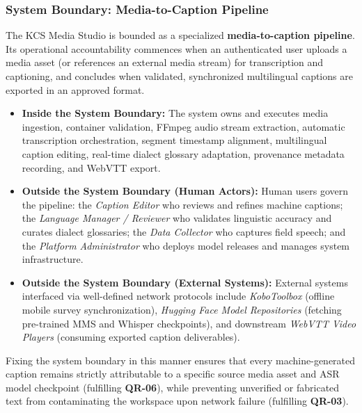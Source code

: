 \documentclass[conference]{IEEEtran}
\begin{document}
\subsubsection{System Boundary: Media-to-Caption Pipeline}
\label{sec:design:arch:boundary}
The KCS Media Studio is bounded as a specialized \textbf{media-to-caption pipeline}. Its operational accountability commences when an authenticated user uploads a media asset (or references an external media stream) for transcription and captioning, and concludes when validated, synchronized multilingual captions are exported in an approved format. 
\begin{itemize}
    \item \textbf{Inside the System Boundary:} The system owns and executes media ingestion, container validation, FFmpeg audio stream extraction, automatic transcription orchestration, segment timestamp alignment, multilingual caption editing, real-time dialect glossary adaptation, provenance metadata recording, and WebVTT export.
    \item \textbf{Outside the System Boundary (Human Actors):} Human users govern the pipeline: the \textit{Caption Editor} who reviews and refines machine captions; the \textit{Language Manager / Reviewer} who validates linguistic accuracy and curates dialect glossaries; the \textit{Data Collector} who captures field speech; and the \textit{Platform Administrator} who deploys model releases and manages system infrastructure.
    \item \textbf{Outside the System Boundary (External Systems):} External systems interfaced via well-defined network protocols include \textit{KoboToolbox} (offline mobile survey synchronization), \textit{Hugging Face Model Repositories} (fetching pre-trained MMS and Whisper checkpoints), and downstream \textit{WebVTT Video Players} (consuming exported caption deliverables).
\end{itemize}
Fixing the system boundary in this manner ensures that every machine-generated caption remains strictly attributable to a specific source media asset and ASR model checkpoint (fulfilling \textbf{QR-06}), while preventing unverified or fabricated text from contaminating the workspace upon network failure (fulfilling \textbf{QR-03}).
\end{document}
